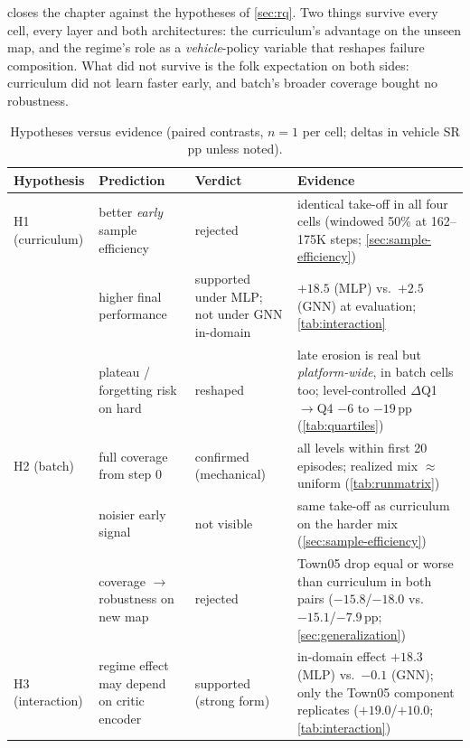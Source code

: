  closes the chapter against the hypotheses of
\cref{sec:rq}. Two things survive every cell, every layer and both
architectures: the curriculum's advantage on the unseen map, and the
regime's role as a \emph{vehicle}-policy variable that reshapes failure
composition. What did not survive is the folk expectation on both sides:
curriculum did not learn faster early, and batch's broader coverage
bought no robustness.

\begin{table}[t]
  \centering\small
  \caption{Hypotheses versus evidence (paired contrasts, $n{=}1$ per
  cell; deltas in vehicle SR pp unless noted).}
  \label{tab:hypotheses}
  \begin{tabular}{@{}p{2.2cm}p{4.6cm}p{2.2cm}p{4.0cm}@{}}
    \toprule
    Hypothesis & Prediction & Verdict & Evidence \\
    \midrule
    H1 (curriculum) & better \emph{early} sample efficiency & rejected &
      identical take-off in all four cells (windowed 50\% at 162--175K
      steps; \cref{sec:sample-efficiency}) \\
    & higher final performance & supported under MLP; not under GNN
      in-domain &
      $+18.5$ (MLP) vs.\ $+2.5$ (GNN) at evaluation;
      \cref{tab:interaction} \\
    & plateau / forgetting risk on hard & reshaped &
      late erosion is real but \emph{platform-wide}, in batch cells too;
      level-controlled $\Delta$Q1$\to$Q4 $-6$ to $-19$\,pp
      (\cref{tab:quartiles}) \\
    \addlinespace
    H2 (batch) & full coverage from step 0 & confirmed (mechanical) &
      all levels within first 20 episodes; realized mix $\approx$
      uniform (\cref{tab:runmatrix}) \\
    & noisier early signal & not visible &
      same take-off as curriculum on the harder mix
      (\cref{sec:sample-efficiency}) \\
    & coverage $\to$ robustness on new map & rejected &
      Town05 drop equal or worse than curriculum in both pairs
      ($-15.8$/$-18.0$ vs.\ $-15.1$/$-7.9$\,pp;
      \cref{sec:generalization}) \\
    \addlinespace
    H3 (interaction) & regime effect may depend on critic encoder &
      supported (strong form) &
      in-domain effect $+18.3$ (MLP) vs.\ $-0.1$ (GNN); only the Town05
      component replicates ($+19.0$/$+10.0$;
      \cref{tab:interaction}) \\
    \bottomrule
  \end{tabular}
\end{table}

